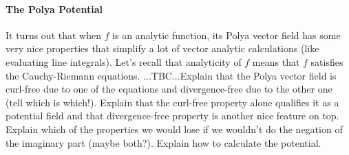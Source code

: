 







\paragraph{The Polya Potential}
It turns out that when $f$ is an analytic function, its Polya vector field has some very nice properties that simplify a lot of vector analytic calculations (like evaluating line integrals). Let's recall that analyticity of $f$ means that $f$ satisfies the Cauchy-Riemann equations. ...TBC...Explain that the Polya vector field is curl-free due to one of the equations and divergence-free due to the other one (tell which is which!). Explain that the curl-free property alone qualifies it as a potential field and that divergence-free property is another nice feature on top. Explain which of the properties we would lose if we wouldn't do the negation of the imaginary part (maybe both?). Explain how to calculate the potential.

